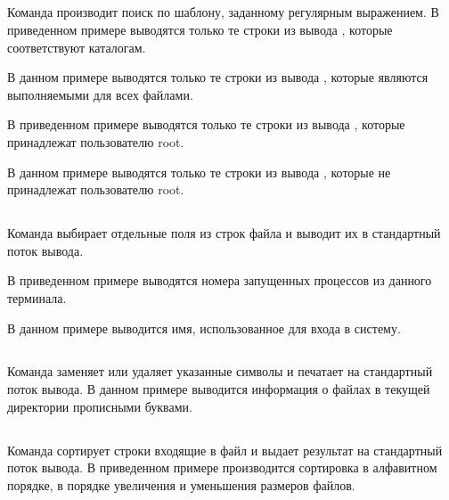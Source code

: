 \subsection{}

Команда  производит поиск по шаблону, заданному регулярным выражением. В приведенном примере выводятся только те строки из вывода , которые соответствуют каталогам.


В данном примере выводятся только те строки из вывода , которые являются выполняемыми для всех файлами.


В приведенном примере выводятся только те строки из вывода , которые принадлежат пользователю root.


В данном примере выводятся только те строки из вывода , которые не принадлежат пользователю root.


\subsection{}

Команда  выбирает отдельные поля из строк файла и выводит их в стандартный поток вывода.

В приведенном примере выводятся номера запущенных процессов из данного терминала. 


В данном примере выводится имя, использованное для входа в систему.


\subsection{}

Команда  заменяет или удаляет указанные символы и печатает на стандартный поток вывода. В данном примере выводится информация о файлах в текущей директории прописными буквами.


\subsection{}

Команда  сортирует строки входящие в файл и выдает результат на стандартный поток вывода. В приведенном примере производится сортировка в алфавитном порядке, в порядке увеличения и уменьшения размеров файлов.


